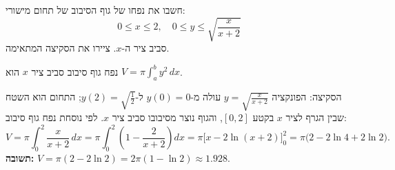 
\begin{question}
חשבו את נפחו של גוף הסיבוב של תחום מישורי:
\[ 0\le x\le2,\quad 0\le y\le\sqrt{\frac{x}{x+2}} \]
סביב ציר ה-$x$. ציירו את הסקיצה המתאימה.
\end{question}

\begin{hint}
נפח גוף סיבוב סביב ציר $x$ הוא $V=\pi\int_a^b y^2\,dx$.
\end{hint}

\begin{solution}
הסקיצה: הפונקציה $y=\sqrt{\frac{x}{x+2}}$ עולה מ-$y(0)=0$ ל-$y(2)=\sqrt{\frac12}$; התחום הוא השטח שבין הגרף לציר $x$ בקטע $[0,2]$, והגוף נוצר מסיבובו סביב ציר $x$. לפי נוסחת נפח גוף סיבוב:
\[ V=\pi\int_0^2\frac{x}{x+2}\,dx=\pi\int_0^2\left(1-\frac{2}{x+2}\right)dx=\pi\Big[x-2\ln(x+2)\Big]_0^2=\pi\big(2-2\ln4+2\ln2\big). \]
\textbf{תשובה:} $V=\pi(2-2\ln2)=2\pi(1-\ln2)\approx1.928$.
\end{solution}
